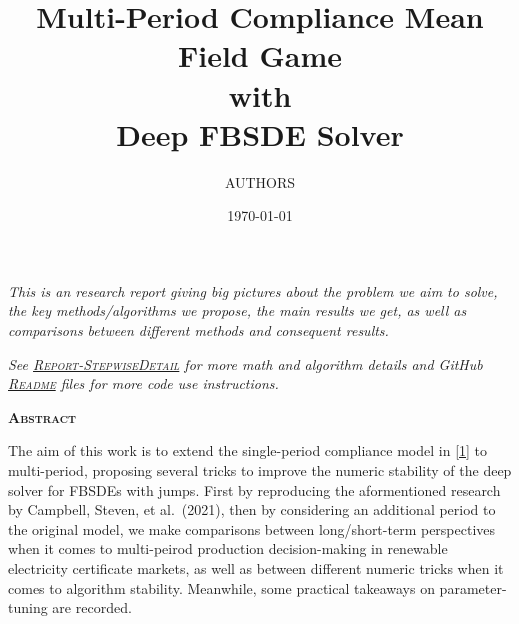 \documentclass{article}
\begin{document}
\pagestyle{fancy}
\fancyhf{}

\title{
    \textbf{\huge
        Multi-Period Compliance Mean Field Game \\
        with \\
        Deep FBSDE Solver}}

\Large\selectfont
\medskip
\author{AUTHORS}
\date{\today}
\maketitle

\hline

\vspace{30pt}

\large
\textit{
This is an research report giving big pictures about the problem we aim
to solve, the key methods/algorithms we propose, the main results we
get, as well as comparisons between different methods and consequent
results.
}

\vspace{20pt}

\textit{
See \href{https://github.com/OrangeAoo/PA-MFG-FBSDE/blob/f95ab0c9c54fb68cb3517f975ac3aa2fb8b3d429/FinalReports/Report-StepwiseDetail.md}{\textsc{Report-StepwiseDetail}} for more math and algorithm details and GitHub \href{https://github.com/OrangeAoo/PA-MFG-FBSDE/blob/3cffc5e8dbe09fbc880f6c2c70d76e0b6a1b8c3c/2Period/Joint_Optim_2Prdx1/README.md}{\textsc{Readme}} files for more code use instructions.
}

\vfill
\newpage

\setlength{\parindent}{0pt}
\testpar
\Large\textbf{\textsc{Abstract}} \\

\vspace{8pt}

\normalsize The aim of this work is to extend the single-period compliance model in
\href{\%22https://doi.org/10.48550/arXiv.2110.01127\%22}{{[}1{]}} to
multi-period, proposing several tricks to improve the numeric stability of the deep solver for FBSDEs with jumps. First by reproducing the aformentioned research by Campbell, Steven, et al.~(2021), then by considering an additional period to the original model, we make comparisons between long/short-term perspectives when it comes to multi-peirod production decision-making in renewable electricity certificate markets, as well as between different numeric tricks when it comes to algorithm stability. Meanwhile, some practical takeaways on parameter-tuning are recorded.
\end{document}
